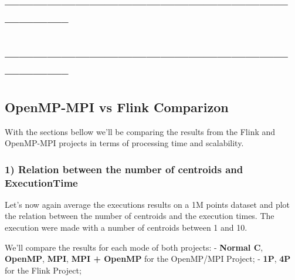 \documentclass[11pt]{article}
\begin{document}
    \hypertarget{section}{%
\subsection{--------------------------------------------------------------------------}\label{section}}

\hypertarget{section-1}{%
\subsection{--------------------------------------------------------------------------}\label{section-1}}

    \hypertarget{openmp-mpi-vs-flink-comparizon}{%
\subsection{OpenMP-MPI vs Flink
Comparizon}\label{openmp-mpi-vs-flink-comparizon}}

    With the sections bellow we'll be comparing the results from the Flink
and OpenMP-MPI projects in terms of processing time and scalability.

    \hypertarget{relation-between-the-number-of-centroids-and-executiontime}{%
\subsubsection{1) Relation between the number of centroids and
ExecutionTime}\label{relation-between-the-number-of-centroids-and-executiontime}}

    Let's now again average the executions results on a 1M points dataset
and plot the relation between the number of centroids and the execution
times. The execution were made with a number of centroids between 1 and
10.

We'll compare the results for each mode of both projects: -
\textbf{Normal C}, \textbf{OpenMP}, \textbf{MPI}, \textbf{MPI + OpenMP}
for the OpenMP/MPI Project; - \textbf{1P}, \textbf{4P} for the Flink
Project;
\end{document}
